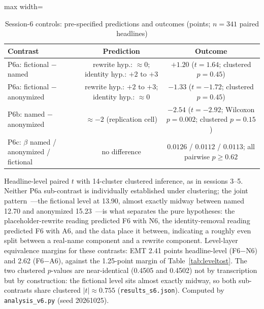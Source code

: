 \begin{table}[htbp]
\centering
\small
\caption{Session-6 controls: pre-specified predictions and outcomes (points; $n=341$ paired headlines)}
\label{tab:s6}
\begin{adjustbox}{max width=\textwidth}
\begin{tabular}{lcc}
\toprule
Contrast & Prediction & Outcome \\
\midrule
P6a: fictional $-$ named & rewrite hyp.: $\approx 0$; identity hyp.: $+2$ to $+3$ & $+1.20$ ($t=1.64$; clustered $p=0.45$) \\
P6a: fictional $-$ anonymized & rewrite hyp.: $+2$ to $+3$; identity hyp.: $\approx 0$ & $-1.33$ ($t=-1.72$; clustered $p=0.45$) \\
P6b: named $-$ anonymized & $\approx -2$ (replication cell) & $-2.54$ ($t=-2.92$; Wilcoxon $p=0.002$; clustered $p=0.15$) \\
P6c: $\beta$ named / anonymized / fictional & no difference & $0.0126$ / $0.0112$ / $0.0113$; all pairwise $p\geq 0.62$ \\
\bottomrule
\end{tabular}
\end{adjustbox}
\begin{tablenotes}[flushleft]\footnotesize
\item Headline-level paired $t$ with 14-cluster clustered inference, as in sessions 3--5. Neither P6a sub-contrast is individually established under clustering; the joint pattern~---the fictional level at 13.90, almost exactly midway between named 12.70 and anonymized 15.23~---is what separates the pure hypotheses: the placeholder-rewrite reading predicted F6 with N6, the identity-removal reading predicted F6 with A6, and the data place it between, indicating a roughly even split between a real-name component and a rewrite component. Level-layer equivalence margins for these contrasts: EMT 2.41 points headline-level (F6$-$N6) and 2.62 (F6$-$A6), against the 1.25-point margin of Table~\ref{tab:leveltost}. The two clustered $p$-values are near-identical (0.4505 and 0.4502) not by transcription but by construction: the fictional level sits almost exactly midway, so both sub-contrasts share clustered $|t|\approx0.755$ (\texttt{results\_s6.json}). Computed by \texttt{analysis\_v6.py} (seed 20261025).
\end{tablenotes}
\end{table}

